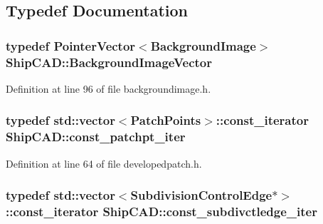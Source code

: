 \subsection{Typedef Documentation}
\subsubsection[{\texorpdfstring{Background\+Image\+Vector}{BackgroundImageVector}}]{\setlength{\rightskip}{0pt plus 5cm}typedef {\bf Pointer\+Vector}$<${\bf Background\+Image}$>$ {\bf Ship\+C\+A\+D\+::\+Background\+Image\+Vector}}\hypertarget{namespaceShipCAD_ac421659cf582dda585c31351043a79d3}{}\label{namespaceShipCAD_ac421659cf582dda585c31351043a79d3}


Definition at line 96 of file backgroundimage.\+h.

\subsubsection[{\texorpdfstring{const\+\_\+patchpt\+\_\+iter}{const_patchpt_iter}}]{\setlength{\rightskip}{0pt plus 5cm}typedef std\+::vector$<${\bf Patch\+Points}$>$\+::const\+\_\+iterator {\bf Ship\+C\+A\+D\+::const\+\_\+patchpt\+\_\+iter}}\hypertarget{namespaceShipCAD_aea0ea62a5074a9ec5618bf822480b840}{}\label{namespaceShipCAD_aea0ea62a5074a9ec5618bf822480b840}


Definition at line 64 of file developedpatch.\+h.

\subsubsection[{\texorpdfstring{const\+\_\+subdivctledge\+\_\+iter}{const_subdivctledge_iter}}]{\setlength{\rightskip}{0pt plus 5cm}typedef std\+::vector$<${\bf Subdivision\+Control\+Edge}$\ast$$>$\+::const\+\_\+iterator {\bf Ship\+C\+A\+D\+::const\+\_\+subdivctledge\+\_\+iter}}\hypertarget{namespaceShipCAD_af78c33b3ea7d42b713572baf86e2b01a}{}\label{namespaceShipCAD_af78c33b3ea7d42b713572baf86e2b01a}


